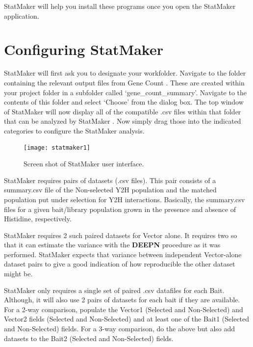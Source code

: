\documentclass[11pt,fleqn]{book} %
\newcommand{\GeneCount}{{\color{Red} Gene Count }}
\newcommand{\DEEPN}{\textbf{DEEPN }}
\newcommand{\StatMaker}{{\color{Dandelion} StatMaker }}
\begin{document}
\StatMaker will help you install these programs once you open the StatMaker application.

\section{Configuring StatMaker}

\StatMaker will first ask you to designate your workfolder.  Navigate to the folder containing the relevant output files from \GeneCount.  These are created within your project folder in a subfolder called ‘gene\_count\_summary’.  Navigate to the contents of this folder and select ‘Choose’ from the dialog box.  The top window of \StatMaker will now display all of the compatible .csv files within that folder that can be analyzed by \StatMaker.  Now simply drag those into the indicated categories to configure the \StatMaker analysis.

\begin{figure}[!ht]
    \centering
    \texttt{[image: statmaker1]}
    \caption{Screen shot of \StatMaker user interface.}
    \label{fig:statmaker_ui}
\end{figure}

\StatMaker requires pairs of datasets (.csv files). This pair consists of a summary.csv file of the Non-selected Y2H population and the matched population put under selection for Y2H interactions.  Basically, the summary.csv files for a given bait/library population grown in the presence and absence of Histidine, respectively.

\StatMaker requires 2 such paired datasets for Vector alone.  It requires two so that it can estimate the variance with the \DEEPN procedure as it was performed.  \StatMaker expects that variance between independent Vector-alone dataset pairs to give a good indication of how reproducible the other dataset might be.


\StatMaker only requires a single set of paired .csv datafiles for each Bait.  Although, it will also use 2 pairs of datasets for each bait if they are available.  For a 2-way comparison, populate the Vector1 (Selected and Non-Selected) and Vector2 fields (Selected and Non-Selected) and at least one of the Bait1 (Selected and Non-Selected) fields.  For a 3-way comparison, do the above but also add datasets to the Bait2 (Selected and Non-Selected) fields.
\end{document}
